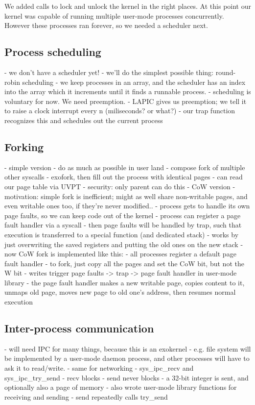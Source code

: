 \documentclass{article}
\begin{document}
We added calls to lock and unlock the kernel in the right places. At this
point our kernel was capable of running multiple user-mode processes
concurrently. However these processes ran forever, so we needed a scheduler
next.


\subsection{Process scheduling}
\label{sec:preempt}
- we don't have a scheduler yet!
- we'll do the simplest possible thing: round-robin scheduling
- we keep processes in an array, and the scheduler has an index into the array
  which it increments until it finds a runnable process.
- scheduling is voluntary for now. We need preemption.
- LAPIC gives us preemption; we tell it to raise a clock interrupt every n
  (miliseconds? or what?)
	- our trap function recognizes this and schedules out the current
	  process


\subsection{Forking}
- simple version
	- do as much as possible in user land
	- compose fork of multiple other syscalls
		- exofork, then fill out the process with identical pages
		- can read our page table via UVPT
		- security: only parent can do this
- CoW version
	- motivation: simple fork is inefficient; might as well share non-writable
	  pages, and even writable ones too, if they're never modified..
	- process gets to handle its own page faults, so we can keep code out of
	  the kernel
	- process can register a page fault handler via a syscall
	- then page faults will be handled by trap, such that execution is
	  transferred to a special function (and dedicated stack)
	  	- works by just overwriting the saved registers and putting the old
		  ones on the new stack
	- now CoW fork is implemented like this:
		- all processes register a default page fault handler
		- to fork, just copy all the pages and set the CoW bit, but not the W
		  bit
		- writes trigger page faults -> trap -> page fault handler in
		  user-mode library
		- the page fault handler makes a new writable page, copies content to
		  it, unmaps old page, moves new page to old one's address, then
		  resumes normal execution
 


\subsection{Inter-process communication}
- will need IPC for many things, because this is an exokernel
	- e.g. file system will be implemented by a user-mode daemon process, and
	  other processes will have to ask it to read/write.
	- same for networking
- sys\_ipc\_recv and sys\_ipc\_try\_send
	- recv blocks
	- send never blocks
	- a 32-bit integer is sent, and optionally also a page of memory
	- also wrote user-mode library functions for receiving and sending
		- send repeatedly calls try\_send
\end{document}
